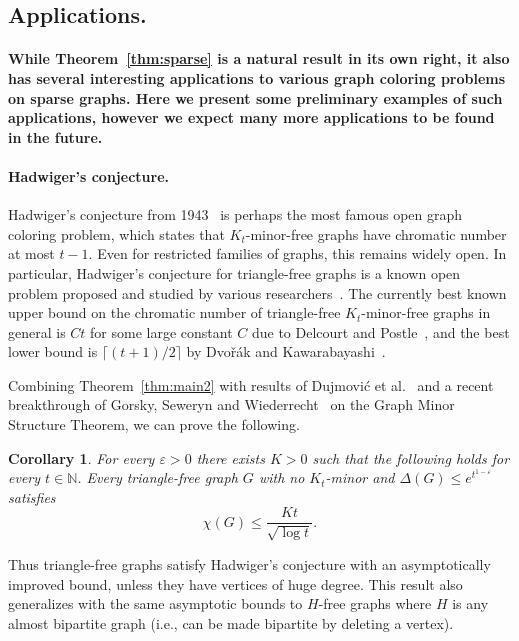 \documentclass[10pt]{amsart}
\newtheorem{corollary}[theorem]{Corollary}
\theoremstyle{definition}
\begin{document}
\subsection{Applications.} 

\paragraph{While Theorem~\ref{thm:sparse} is a natural result in its own right, it also has several interesting applications to various graph coloring problems on sparse graphs. Here we present some preliminary examples of such applications, however we expect many more applications to be found in the future.}

\paragraph*{\textbf{Hadwiger's conjecture.}} Hadwiger's conjecture from 1943~\cite{hadwiger} is perhaps the most famous open graph coloring problem, which states that $K_t$-minor-free graphs have chromatic number at most $t-1$. Even for restricted families of graphs, this remains widely open. In particular, Hadwiger's conjecture for triangle-free graphs is a known open problem proposed and studied by various researchers~\cite{bucic,delcourt,dvorak,norin}. The currently best known upper bound on the chromatic number of triangle-free $K_t$-minor-free graphs in general is $Ct$ for some large constant $C$ due to Delcourt and Postle~\cite{delcourt}, and the best lower bound is $\lceil (t+1)/2\rceil$ by Dvo\v{r}\'{a}k and Kawarabayashi~\cite{dvorakkawab}.
    
Combining Theorem~\ref{thm:main2} with results of Dujmovi\'{c} et al.~\cite{dujmovic} and a recent breakthrough of Gorsky, Seweryn and Wiederrecht~\cite{gowi} on the Graph Minor Structure Theorem, we can prove the following.
    \begin{corollary}\label{cor:had1} For every $\varepsilon>0$ there exists $K>0$ such that the following holds for every $t\in \mathbb{N}$. Every triangle-free graph $G$ with no $K_t$-minor and $\Delta(G)\le e^{t^{1-\varepsilon}}$ satisfies $$\chi(G)\le \frac{Kt}{\sqrt{\log t}}.$$ 
    \end{corollary}
    Thus triangle-free graphs satisfy Hadwiger's conjecture with an asymptotically improved bound, unless they have vertices of huge degree. This result also generalizes with the same asymptotic bounds to $H$-free graphs where $H$ is any almost bipartite graph (i.e., can be made bipartite by deleting a vertex).
\end{document}
